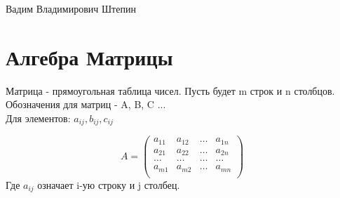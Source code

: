 
	Вадим Владимирович Штепин
	\section{Алгебра Матрицы}
	\begin{definition}
		Матрица - прямоугольная таблица чисел. Пусть будет m строк и n столбцов. \\
		Обозначения для матриц - A, B, C ... \\
		Для элементов: \(a_{ij}, b_{ij}, c_{ij}\)
	\end{definition}
	\[A = \begin{pmatrix}
		a_{11} & a_{12} & \ldots & a_{1n} \\
		a_{21} & a_{22} & \ldots & a_{2n} \\
		\ldots & \ldots & \ldots & \ldots \\
		a_{m1} & a_{m2} & \ldots & a_{mn} \\
	\end{pmatrix}\]
	Где \(a_{ij}\) означает i-ую строку и j столбец.
